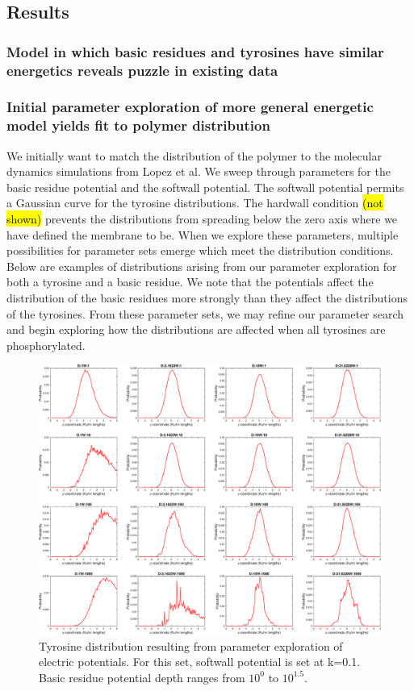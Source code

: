 \documentclass[../../AdvancementSummary.tex]{subfiles}
\begin{document}
\subsection{Results}
\subsubsection{Model in which basic residues and tyrosines have similar energetics reveals puzzle in existing data}

\subsubsection{Initial parameter exploration of more general energetic model yields fit to polymer distribution}

We initially want to match the distribution of the polymer to the molecular dynamics simulations from Lopez et al. We sweep through parameters for the basic residue potential and the softwall potential. The softwall potential permits a Gaussian curve for the tyrosine distributions.  The hardwall condition \hl{(not shown)} prevents the distributions from spreading below the zero axis where we have defined the membrane to be. When we explore these parameters, multiple possibilities for parameter sets emerge which meet the distribution conditions. Below are examples of distributions arising from our parameter exploration for both a tyrosine and a basic residue. We note that the potentials affect the distribution of the basic residues more strongly than they affect the distributions of the tyrosines. From these parameter sets, we may refine our parameter search and begin exploring how the distributions are affected when all tyrosines are phosphorylated. 

\begin{figure}[H]
	\begin{center}
		\includegraphics[width=0.8\linewidth]{ResultsFigures/Electro/DistributioniSite2.eps}
	\end{center}
	\caption{Tyrosine distribution resulting from parameter exploration of electric potentials. For this set, softwall potential is set at k=0.1. Basic residue potential depth ranges from $10^0$ to $10^{1.5}$.}
\end{figure}
\end{document}
